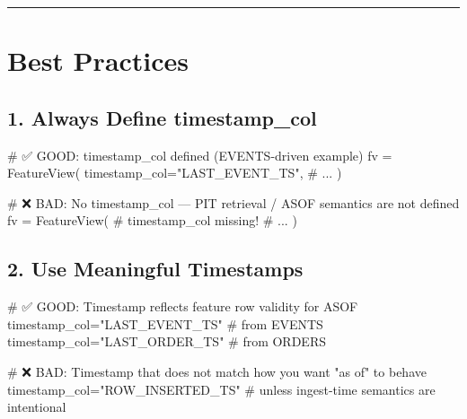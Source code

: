\documentclass[
  letterpaper,
  DIV=11,
  numbers=noendperiod]{scrreprt}
\newenvironment{Shaded}{\begin{snugshade}}{\end{snugshade}}
\newcommand{\CommentTok}[1]{\textcolor[rgb]{0.37,0.37,0.37}{#1}}
\newcommand{\NormalTok}[1]{\textcolor[rgb]{0.00,0.23,0.31}{#1}}
\newcommand{\OperatorTok}[1]{\textcolor[rgb]{0.37,0.37,0.37}{#1}}
\newcommand{\StringTok}[1]{\textcolor[rgb]{0.13,0.47,0.30}{#1}}
\begin{document}
\begin{center}\rule{0.5\linewidth}{0.5pt}\end{center}

\hypertarget{best-practices-4}{%
\section{Best Practices}\label{best-practices-4}}

\hypertarget{always-define-timestamp_col}{%
\subsection{1. Always Define
timestamp\_col}\label{always-define-timestamp_col}}

\begin{Shaded}
\begin{Highlighting}[]
\CommentTok{\# ✅ GOOD: timestamp\_col defined (EVENTS{-}driven example)}
\NormalTok{fv }\OperatorTok{=}\NormalTok{ FeatureView(}
\NormalTok{    timestamp\_col}\OperatorTok{=}\StringTok{"LAST\_EVENT\_TS"}\NormalTok{,}
    \CommentTok{\# ...}
\NormalTok{)}

\CommentTok{\# ❌ BAD: No timestamp\_col — PIT retrieval / ASOF semantics are not defined}
\NormalTok{fv }\OperatorTok{=}\NormalTok{ FeatureView(}
    \CommentTok{\# timestamp\_col missing!}
    \CommentTok{\# ...}
\NormalTok{)}
\end{Highlighting}
\end{Shaded}

\hypertarget{use-meaningful-timestamps}{%
\subsection{2. Use Meaningful
Timestamps}\label{use-meaningful-timestamps}}

\begin{Shaded}
\begin{Highlighting}[]
\CommentTok{\# ✅ GOOD: Timestamp reflects feature row validity for ASOF}
\NormalTok{timestamp\_col}\OperatorTok{=}\StringTok{"LAST\_EVENT\_TS"}   \CommentTok{\# from EVENTS}
\NormalTok{timestamp\_col}\OperatorTok{=}\StringTok{"LAST\_ORDER\_TS"}   \CommentTok{\# from ORDERS}

\CommentTok{\# ❌ BAD: Timestamp that does not match how you want "as of" to behave}
\NormalTok{timestamp\_col}\OperatorTok{=}\StringTok{"ROW\_INSERTED\_TS"}  \CommentTok{\# unless ingest{-}time semantics are intentional}
\end{Highlighting}
\end{Shaded}
\end{document}
